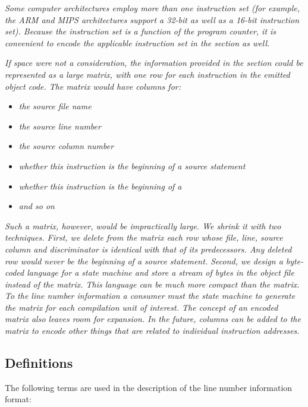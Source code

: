 \textit{Some computer architectures employ more than one instruction
set (for example, the ARM 
and 
MIPS architectures support
a 32-bit as well as a 16-bit instruction set). Because the
instruction set is a function of the program counter, it is
convenient to encode the applicable instruction set in the
\dotdebugline{} section as well.}

\textit{If space were not a consideration, the information provided
in the \dotdebugline{} 
section could be represented as a large
matrix, with one row for each instruction in the emitted
object code. The matrix would have columns for:}
\begin{itemize}
\item \textit{the source file name}
\item \textit{the source line number}
\item \textit{the source column number}
\item \textit{whether this instruction is the beginning of a source statement}
\item \textit{whether this instruction is the beginning of a }
\item \textit{and so on}
\end{itemize}
\textit{Such a matrix, however, would be impractically large. We
shrink it with two techniques. First, we delete from
the matrix each row whose file, line, source column and
discriminator 
is identical with that of its
predecessors. Any deleted row would never be the beginning of
a source statement. Second, we design a byte-coded language
for a state machine and store a stream of bytes in the object
file instead of the matrix. This language can be much more
compact than the matrix. To the line number information a 
consumer must  the state machine
to generate the matrix for each compilation unit of interest.
The concept of an encoded matrix also leaves
room for expansion. In the future, columns can be added to the
matrix to encode other things that are related to individual
instruction addresses.}

\subsection{Definitions}
\label{chap:definitions}
The following terms are used in the description of the line
number information format:

